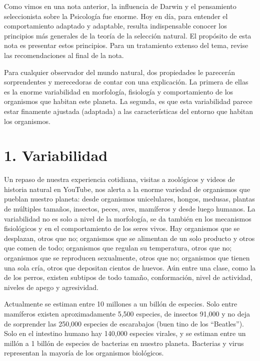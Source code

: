 \documentclass[
  letterpaper,
]{book}
\begin{document}
Como vimos en una nota anterior, la influencia de Darwin y el
pensamiento seleccionista sobre la Psicología fue enorme. Hoy en día,
para entender el comportamiento adaptado y adaptable, resulta
indispensable conocer los principios más generales de la teoría de la
selección natural. El propósito de esta nota es presentar estos
principios. Para un tratamiento extenso del tema, revise las
recomendaciones al final de la nota.

Para cualquier observador del mundo natural, dos propiedades le
parecerán sorprendentes y merecedoras de contar con una explicación. La
primera de ellas es la enorme variabilidad en morfología, fisiología y
comportamiento de los organismos que habitan este planeta. La segunda,
es que esta variabilidad parece estar finamente ajustada (adaptada) a
las características del entorno que habitan los organismos.

\section{1. Variabilidad}\label{variabilidad}

Un repaso de nuestra experiencia cotidiana, visitas a zoológicos y
videos de historia natural en YouTube, nos alerta a la enorme variedad
de organismos que pueblan nuestro planeta: desde organismos
unicelulares, hongos, medusas, plantas de múltiples tamaños, insectos,
peces, aves, mamíferos y desde luego humanos. La variabilidad no es solo
a nivel de la morfología, se da también en los mecanismos fisiológicos y
en el comportamiento de los seres vivos. Hay organismos que se
desplazan, otros que no; organismos que se alimentan de un solo producto
y otros que comen de todo; organismos que regulan su temperatura, otros
que no; organismos que se reproducen sexualmente, otros que no;
organismos que tienen una sola cría, otros que depositan cientos de
huevos. Aún entre una clase, como la de los perros, existen subtipos de
todo tamaño, conformación, nivel de actividad, niveles de apego y
agresividad.

Actualmente se estiman entre 10 millones a un billón de especies. Solo
entre mamíferos existen aproximadamente 5,500 especies, de insectos
91,000 y no deja de sorprender las 250,000 especies de escarabajos (buen
tino de los ``Beatles''). Solo en el intestino humano hay 140,000
especies virales, y se estiman entre un millón a 1 billón de especies de
bacterias en nuestro planeta. Bacterias y virus representan la mayoría
de los organismos biológicos.
\end{document}

